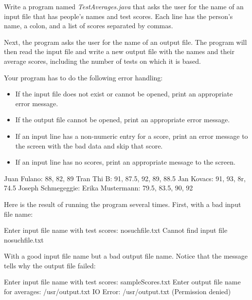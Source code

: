 \begin{exercise}
Write a program named {\em TestAverages.java} that asks the user for the name of an input file that has people's names and test scores. Each line has the person's name, a colon, and a list of scores separated by commas.

Next, the program asks the user for the name of an output file. The program will then read the input file and write a new output file with the names and their average scores, including the number of tests on which it is based.

Your program has to do the following error handling:

\begin{itemize}
\item If the input file does not exist or cannot be opened, print an appropriate error message.
\item If the output file cannot be opened, print an appropriate error message.
\item If an input line has a non-numeric entry for a score, print an error message to the screen with the bad data and skip that score.
\item If an input line has no scores, print an appropriate message to the screen.
\end{itemize}


\begin{stdout}
Juan Fulano: 88, 82, 89
Tran Thi B: 91, 87.5, 92, 89, 88.5
Jan Kovacs: 91, 93, 8r, 74.5
Joseph Schmegeggie:
Erika Mustermann: 79.5, 83.5, 90, 92
\end{stdout}

Here is the result of running the program several times. First, with a bad input file name:

\begin{stdout}
Enter input file name with test scores: nosuchfile.txt
Cannot find input file nosuchfile.txt
\end{stdout}

With a good input file name but a bad output file name. Notice that the message tells why the output file failed:

\begin{stdout}
Enter input file name with test scores: sampleScores.txt
Enter output file name for averages: /usr/output.txt
IO Error: /usr/output.txt (Permission denied)
\end{stdout}


\end{exercise}

